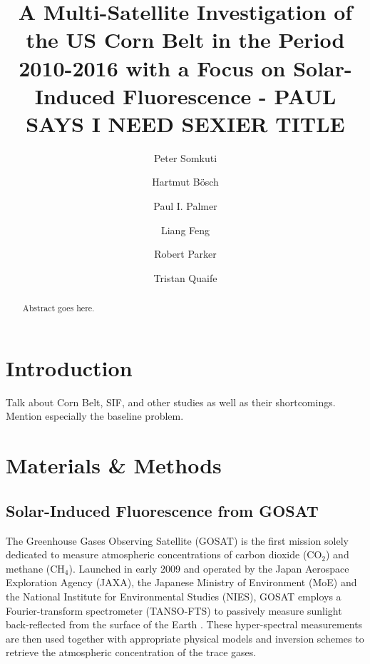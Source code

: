 \documentclass[preprint, a4paper, 10pt, times, 5p]{elsarticle}
\begin{document}
\begin{frontmatter}

\title{A Multi-Satellite Investigation of the US Corn Belt in the Period 2010-2016 with a Focus on Solar-Induced Fluorescence - PAUL SAYS I NEED SEXIER TITLE}

\author[uol,nceo]{Peter Somkuti}
\author[uol,nceo]{Hartmut B\"osch}
\author[uoe,nceo-uoe]{Paul I. Palmer}
\author[uoe,nceo-uoe]{Liang Feng}
\author[uol,nceo]{Robert Parker}
\author[read,nceo]{Tristan Quaife}

\address[uol]{Department of Physics of Astronomy, University of Leicester, Leicester, UK}
\address[uoe]{School of Geosciences, University of Edinburgh, Edinburgh, UK}
\address[read]{University of Reading, Reading, UK}
\address[nceo]{National Centre for Earth Observation, University of Leicester, Leicester, UK}
\address[nceo-uoe]{National Centre for Earth Observation, University of Edinburgh, Edinburgh, UK}

\begin{abstract}
Abstract goes here.
\end{abstract}

\end{frontmatter}
\linenumbers

\section{Introduction}

Talk about Corn Belt, SIF, and other studies as well as their shortcomings. Mention especially the baseline problem.

\section{Materials \& Methods}
\subsection{Solar-Induced Fluorescence from GOSAT}
\label{sec:GOSAT_SIF}

The Greenhouse Gases Observing Satellite (GOSAT) is the first mission solely dedicated to measure atmospheric concentrations of carbon dioxide (CO$_2$) and methane (CH$_4$). Launched in early 2009 and operated by the Japan Aerospace Exploration Agency (JAXA), the Japanese Ministry of Environment (MoE) and the National Institute for Environmental Studies (NIES), GOSAT employs a Fourier-transform spectrometer (TANSO-FTS) to passively measure sunlight back-reflected from the surface of the Earth \citep{yokota2009global}. These hyper-spectral measurements are then used together with appropriate physical models and inversion schemes to retrieve the atmospheric concentration of the trace gases.
\end{document}

